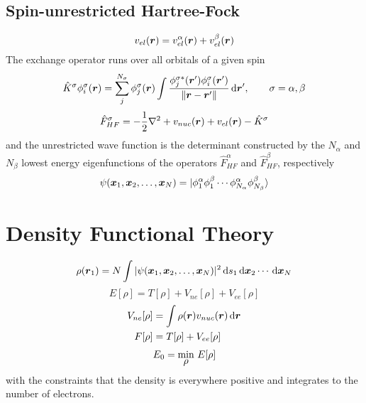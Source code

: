 \subsection{Spin-unrestricted Hartree-Fock}
\begin{equation}
    v_{el}(\boldsymbol r) = v_{el}^\alpha (\boldsymbol r) + v_{el}^\beta (\boldsymbol r)
\end{equation}
The exchange operator runs over all orbitals of a given spin
\begin{equation}
    \hat{K}^\sigma\phi_i^\sigma(\boldsymbol r) 
	= \sum_j^{N_\sigma} \phi_j^\sigma (\boldsymbol r) 
	    \int \frac{\phi_j^{\sigma\ast}(\boldsymbol r')\phi_i^\sigma(\boldsymbol r')}
	    {\|\boldsymbol r - \boldsymbol r'\|} \,\mathrm{d} \boldsymbol r', \qquad \sigma = \alpha, \beta
\end{equation}
\begin{equation}
    \hat{F}_{HF}^\sigma = -\frac{1}{2}\nabla^2 + v_{nuc}(\boldsymbol r) + v_{el}(\boldsymbol r) - \hat{K}^\sigma 
\end{equation}
and the unrestricted wave function is the determinant constructed by the $N_\alpha$ and 
$N_\beta$ lowest energy eigenfunctions of the operators $\hat{F}_{HF}^\alpha$ and 
$\hat{F}_{HF}^\beta$, respectively
\begin{equation}
    \psi(\boldsymbol x_1,\boldsymbol x_2,\dots,\boldsymbol x_N) = 
    |\phi_1^\alpha\phi_1^\beta\cdots\phi_{N_\alpha}^\alpha\phi_{N_\beta}^\beta\rangle
\end{equation}

\section{Density Functional Theory} \label{sec:DFT}
\begin{equation}
    \rho(\boldsymbol r_1) = N \int |\psi(\boldsymbol x_1,\boldsymbol x_2,\dots,\boldsymbol x_N)|^2 
	\,\mathrm{d} s_1 \,\mathrm{d} \boldsymbol x_2 \cdots \,\mathrm{d} \boldsymbol x_N
\end{equation}
\begin{equation}
    E[\rho] = T[\rho] + V_{ne}[\rho] + V_{ee}[\rho]
\end{equation}
\begin{align}
    V_{ne}[\rho] &= \int \rho(\boldsymbol r)v_{nuc}(\boldsymbol r) \,\mathrm{d} \boldsymbol r\\
    F[\rho] &= T[\rho] + V_{ee}[\rho]
\end{align}
\begin{equation}
    E_0 = \mymin{\rho}\ E[\rho]
\end{equation}
with the constraints that the density is everywhere positive and integrates to the number
of electrons.

